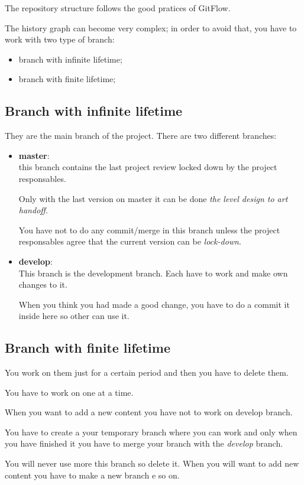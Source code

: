 \documentclass[12pt]{article}
\begin{document}
The repository structure follows the good pratices of GitFlow.

The history graph can become very complex; in order to avoid that, you have to work with two type of branch:
\begin{itemize}
\item branch with infinite lifetime;
\item branch with finite lifetime;
\end{itemize}

\subsection{Branch with infinite lifetime}
They are the main branch of the project. There are two different branches:
\begin{itemize}
\item \textbf{master}:\\
  this branch contains %
  the last project review locked down by the project responsables.
    
  Only with the last version on master it can be done \textit{the level design to art handoff}.
  
  You have not to do any commit/merge in this branch unless the project responsables agree that the current version can be \textit{lock-down}.
\item \textbf{develop}:\\
  This branch is the development branch. Each have to work and make own changes to it.
  
  When you think you had made a good change, you have to do a commit it inside here so other can use it.
\end{itemize}

\subsection{Branch with finite lifetime}
You work on them just for a certain period and then you have to delete them.

You have to work on one at a time.

When you want to add a new content you have not to work on develop branch.

You have to create a your temporary branch where you can work and only when you have finished it
you have to merge your branch with the \textit{develop} branch.

You will never use more this branch so delete it. When you will want to add new content you have to make a new branch e so on. 
\end{document}
